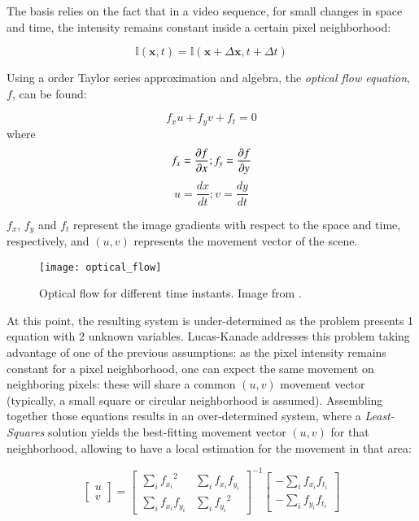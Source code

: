 The basis relies on the fact that in a video sequence, for small changes in space and time, the intensity remains constant inside a certain pixel neighborhood:

$$
\mathbb{I}(\mathbf{x}, t) = \mathbb{I}(\mathbf{x} + \Delta \textbf{x}, t + \Delta t)
$$

Using a  order Taylor series approximation and algebra, the \textit{optical flow equation}, $f$, can be found\cite{lucas_kanade_tutorial}:

$$
f_xu+ f_yv + f_t = 0
$$
where
$$
f_x = \frac{\partial f}{\partial x} ; f_y = \frac{\partial f}{\partial y}\\
$$
$$
u = \frac{dx}{dt} ; v = \frac{dy}{dt}
$$

$f_x$, $f_y$ and $f_t$ represent the image gradients with respect to the space and time, respectively, and $(u, v)$ represents the movement vector of the scene.

\begin{figure}[h]
	\centering
	\texttt{[image: optical\_flow]}
	\caption{Optical flow for different time instants. Image from \cite{lucas_kanade_tutorial}.}
	\label{fig:2_optical_flow}
\end{figure}

At this point, the resulting system is under-determined as the problem presents 1 equation with 2 unknown variables. Lucas-Kanade addresses this problem taking advantage of one of the previous assumptions: as the pixel intensity remains constant for a pixel neighborhood, one can expect the same movement on neighboring pixels: these will share a common $(u, v)$ movement vector (typically, a small square or circular neighborhood is assumed). Assembling together those equations results in an over-determined system, where a \textit{Least-Squares} solution yields the best-fitting movement vector $(u,v)$ for that neighborhood, allowing to have a local estimation for the movement in that area:

\begin{equation}
\begin{bmatrix} u \\ v \end{bmatrix} = \begin{bmatrix} \sum_{i}{f_{x_i}}^2 & \sum_{i}{f_{x_i} f_{y_i} } \\ \sum_{i}{f_{x_i} f_{y_i}} & \sum_{i}{f_{y_i}}^2 \end{bmatrix}^{-1} \begin{bmatrix} - \sum_{i}{f_{x_i} f_{t_i}} \\ - \sum_{i}{f_{y_i} f_{t_i}} \end{bmatrix}
\label{eqn:2_lk_ls}
\end{equation}

